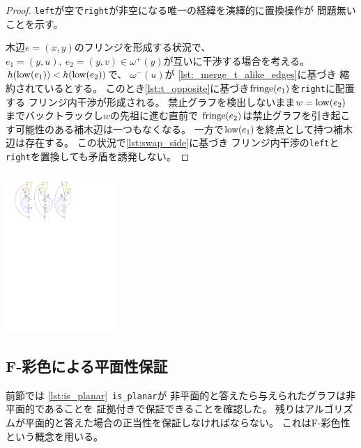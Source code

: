 \begin{paracol}{2}
\begin{proof}
{\tt left}が空で{\tt right}が非空になる唯一の経緯を演繹的に置換操作が
問題無いことを示す。

木辺$e=(x, y)$のフリンジを形成する状況で、
$e_1=(y, u),~ e_2=(y, v) \in \omega^+(y)$が互いに干渉する場合を考える。
$h(\operatorname{low}(e_1)) < h(\operatorname{low}(e_2))$で、
$\omega^-(u)$が
\lstrefname\ref{lst:_merge_t_alike_edges}に基づき
縮約されているとする。
このとき\lstrefname\ref{lst:t_opposite}に基づき$\operatorname{fringe}(e_1)$を{\tt right}に配置する
フリンジ内干渉が形成される。
禁止グラフを検出しないまま$w=\operatorname{low}(e_2)$までバックトラックし$w$の先祖に進む直前で
$\operatorname{fringe}(e_2)$は禁止グラフを引き起こす可能性のある補木辺は一つもなくなる。
一方で$\operatorname{low}(e_1)$を終点として持つ補木辺は存在する。
この状況で\lstrefname\ref{lst:swap_side}に基づき
フリンジ内干渉の{\tt left}と{\tt right}を置換しても矛盾を誘発しない。
%
\end{proof}
\switchcolumn
\vspace{1.\intextsep}
\centering
\includegraphics[width=0.32\textwidth]{figures/swap_side.pdf}
\end{paracol}



\subsection{F-彩色による平面性保証}
前節では
\lstrefname\ref{lst:is_planar}~{\tt is\_planar}が
非平面的と答えたら与えられたグラフは非平面的であることを
証拠付きで保証できることを確認した。
残りはアルゴリズムが平面的と答えた場合の正当性を保証しなければならない。
これはF-彩色性という概念を用いる。

